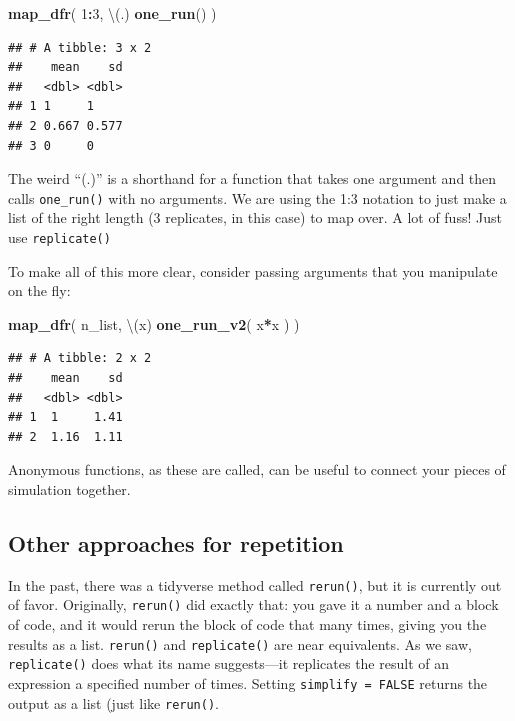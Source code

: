 \documentclass[
]{book}
\newenvironment{Shaded}{\begin{snugshade}}{\end{snugshade}}
\newcommand{\DecValTok}[1]{\textcolor[rgb]{0.00,0.00,0.81}{#1}}
\newcommand{\FunctionTok}[1]{\textcolor[rgb]{0.13,0.29,0.53}{\textbf{#1}}}
\newcommand{\NormalTok}[1]{#1}
\newcommand{\SpecialCharTok}[1]{\textcolor[rgb]{0.81,0.36,0.00}{\textbf{#1}}}
\begin{document}
\begin{Shaded}
\begin{Highlighting}[]
\FunctionTok{map\_dfr}\NormalTok{( }\DecValTok{1}\SpecialCharTok{:}\DecValTok{3}\NormalTok{, \textbackslash{}(.) }\FunctionTok{one\_run}\NormalTok{() )}
\end{Highlighting}
\end{Shaded}

\begin{verbatim}
## # A tibble: 3 x 2
##    mean    sd
##   <dbl> <dbl>
## 1 1     1    
## 2 0.667 0.577
## 3 0     0
\end{verbatim}

The weird ``(.)'' is a shorthand for a function that takes one argument and then calls \texttt{one\_run()} with no arguments. We are using the 1:3 notation to just make a list of the right length (3 replicates, in this case) to map over. A lot of fuss! Just use \texttt{replicate()}

To make all of this more clear, consider passing arguments that you manipulate on the fly:

\begin{Shaded}
\begin{Highlighting}[]
\FunctionTok{map\_dfr}\NormalTok{( n\_list, \textbackslash{}(x) }\FunctionTok{one\_run\_v2}\NormalTok{( x}\SpecialCharTok{*}\NormalTok{x ) )}
\end{Highlighting}
\end{Shaded}

\begin{verbatim}
## # A tibble: 2 x 2
##    mean    sd
##   <dbl> <dbl>
## 1  1     1.41
## 2  1.16  1.11
\end{verbatim}

Anonymous functions, as these are called, can be useful to connect your pieces of simulation together.

\subsection{Other approaches for repetition}\label{other-approaches-for-repetition}

In the past, there was a tidyverse method called \texttt{rerun()}, but it is currently out of favor.
Originally, \texttt{rerun()} did exactly that: you gave it a number and a block of code, and it would rerun the block of code that many times, giving you the results as a list.
\texttt{rerun()} and \texttt{replicate()} are near equivalents.
As we saw, \texttt{replicate()} does what its name suggests---it replicates the result of an expression a specified number of times. Setting \texttt{simplify\ =\ FALSE} returns the output as a list (just like \texttt{rerun()}.
\end{document}
